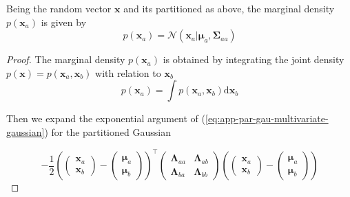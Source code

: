 \begin{appendices}
  \begin{theorem}[Marginalization]
    Being the random vector $\mathbf{x}$ and its partitioned as above, the marginal density $p(\mathbf{x}_a)$ is given by
    \begin{displaymath}
      p(\mathbf{x}_a) = \mathcal{N}\left( \mathbf{x}_a | \boldsymbol{\mu}_a, \boldsymbol{\Sigma}_{aa} \right)
    \end{displaymath}
  \end{theorem}

  \begin{proof}
    The marginal density $p(\mathbf{x}_a)$ is obtained by integrating the joint density $p(\mathbf{x})=p\left(\mathbf{x}_{a}, \mathbf{x}_{b}\right)$ with relation to $\mathbf{x}_b$
    \begin{equation}
      p\left(\mathbf{x}_{a}\right)=\int p\left(\mathbf{x}_{a}, \mathbf{x}_{b}\right) \mathrm{d} \mathbf{x}_{b}
    \end{equation}

    Then we expand the exponential argument of (\ref{eq:app-par-gau-multivariate-gaussian}) for the partitioned Gaussian

    \begin{equation}
      -\frac{1}{2}
      \left( \begin{pmatrix}
        \mathbf{x}_a \\  
        \mathbf{x}_b 
        \end{pmatrix}
        -\begin{pmatrix}
          \boldsymbol{\mu}_a \\
          \boldsymbol{\mu}_b
        \end{pmatrix}
        \right)^\top
        \begin{pmatrix}
          \boldsymbol{\Lambda}_{aa} & \boldsymbol{\Lambda}_{ab}  \\
          \boldsymbol{\Lambda}_{ba} & \boldsymbol{\Lambda}_{bb}
        \end{pmatrix} 
        \left( \begin{pmatrix}
          \mathbf{x}_a \\  
          \mathbf{x}_b 
          \end{pmatrix}
          -\begin{pmatrix}
            \boldsymbol{\mu}_a \\
            \boldsymbol{\mu}_b
          \end{pmatrix}
          \right)
    \end{equation}
    

\end{proof}
\end{appendices}
